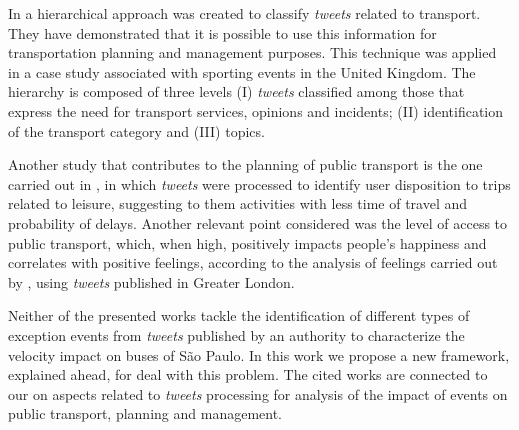 \documentclass[runningheads]{llncs}
\begin{document}
In \cite{Gal-Tzur2014} a hierarchical approach was created to classify \textit{tweets} related to transport. They have demonstrated that it is possible to use this information for transportation planning and management purposes. This technique was applied in a case study associated with sporting events in the United Kingdom. The hierarchy is composed of three levels (I) \textit{tweets} classified among those that express the need for transport services, opinions and incidents; (II) identification of the transport category and (III) topics.

Another study that contributes to the planning of public transport is the one carried out in \cite {Gkiotsalitis2015, Gkiotsalitis2016}, in which \textit{tweets} were processed to identify user disposition to trips related to leisure, suggesting to them activities with less time of travel and probability of delays. Another relevant point considered was the level of access to public transport, which, when high, positively impacts people's happiness and correlates with positive feelings, according to the analysis of feelings carried out by \cite{Guo2016}, using \textit{tweets} published in Greater London.

Neither of the presented works tackle the identification of different types of exception events from \textit{tweets} published by an authority to characterize the velocity impact on buses of São Paulo. In this work we propose a new framework, explained ahead, for deal with this problem.
The cited works are connected to our on aspects related to \textit{tweets} processing for analysis of the impact of events on public transport, planning and management.

\end{document}
